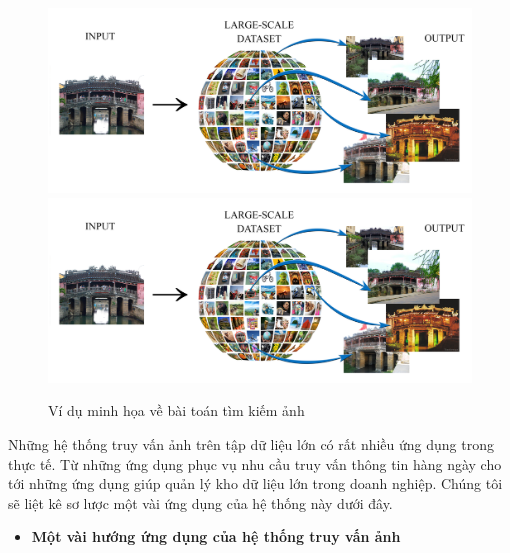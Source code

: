\begin{figure}[!htbp]
  \begin{center}
    \leavevmode
    \ifpdf
      \includegraphics[scale=0.113]{retrievalSystem}
    \else
      \includegraphics[scale=0.113]{retrievalSystem}
    \fi
    \caption[Ví dụ minh họa về bài toán tìm kiếm ảnh]{Ví dụ minh họa về bài toán tìm kiếm ảnh}
    \label{FigSystem}
  \end{center}
\end{figure} 

Những hệ thống truy vấn ảnh trên tập dữ liệu lớn có rất nhiều ứng dụng trong thực tế. Từ những ứng dụng phục vụ nhu cầu truy vấn thông tin hàng ngày cho tới những ứng dụng giúp quản lý kho dữ liệu lớn trong doanh nghiệp. Chúng tôi sẽ liệt kê sơ lược một vài ứng dụng của hệ thống này dưới đây.

\begin{itemize}
\renewcommand{\labelitemi}{$\ast$}
\item \textbf{Một vài hướng ứng dụng của hệ thống truy vấn ảnh}
\end{itemize}

